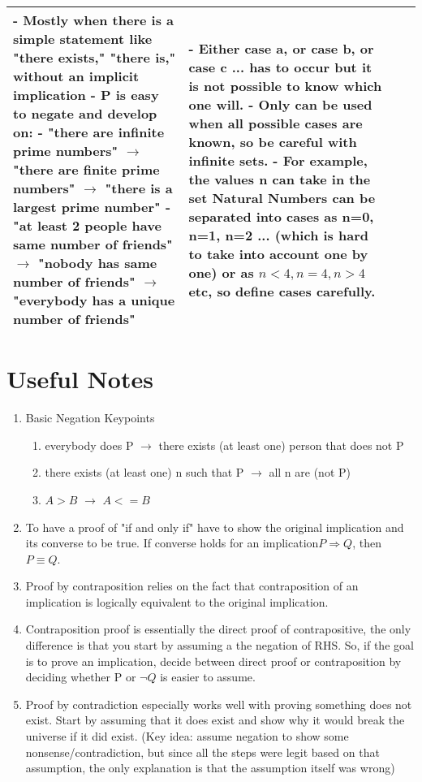 \documentclass[11pt]{article}
\begin{document}
\begin{tabular}{ |m{10em}|m{10em}|m{11em}|m{11em}| }
- Mostly when there is a simple statement like "there exists," "there is," without an implicit implication \newline
- P is easy to negate and develop on: \newline
- "there are infinite prime numbers" $\rightarrow$ "there are finite prime numbers" $\rightarrow$ "there is a largest prime number" \newline
- "at least 2 people have same number of friends" $\rightarrow$ "nobody has same number of friends" $\rightarrow$ "everybody has a unique number of friends"  & 
- Either case a, or case b, or case c ... has to occur but it is not possible to know which one will. \newline
- Only can be used when all possible cases are known, so be careful with infinite sets. \newline
- For example, the values n can take in the set Natural Numbers can be separated into cases as n=0, n=1, n=2 ... (which is hard to take into account one by one) or as $n<4, n=4, n>4$ etc, so define cases carefully. \\ 
\hline
\end{tabular}


\newpage
\section*{Useful Notes}
\begin{enumerate}
\item Basic Negation Keypoints
\begin{enumerate}
\item everybody does P $\rightarrow$  there exists (at least one) person that does not P
\item there exists (at least one) n such that P $\rightarrow$ all n are (not P)
\item $A > B$ $\rightarrow$ $A<= B$ 
\end{enumerate}

\item To have a proof of "if and only if" have to show the original implication and its converse to be true. If converse holds for an implication$P \Rightarrow Q$, then $ P \equiv Q$.
\item Proof by contraposition relies on the fact that contraposition of an implication is logically equivalent to the original implication.
\item Contraposition proof is essentially the direct proof of contrapositive, the only difference is that you start by assuming a the negation of RHS. So, if the goal is to prove an implication, decide between direct proof or contraposition by deciding whether P or $\neg Q$ is easier to assume.
\item Proof by contradiction especially works well with proving something does not exist. Start by assuming that it does exist and show why it would break the universe if it did exist. (Key idea: assume negation to show some nonsense/contradiction, but since all the steps were legit based on that assumption, the only explanation is that the assumption itself was wrong)



\end{enumerate}
\end{document}
